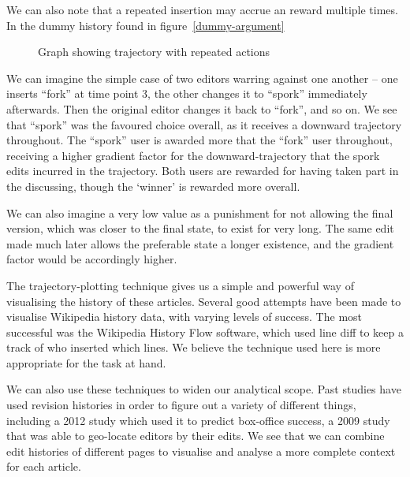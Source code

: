 We can also note that a repeated insertion may accrue an reward
multiple times. In the dummy history found in figure~\ref{dummy-argument}

\begin{wrapfigure}{i}{0.4\textwidth}
  \centering
  \pgfplotsset{width=0.4\textwidth}
  \caption{Graph showing trajectory with repeated actions}
  \label{fig:dummy-argument}
\end{wrapfigure}

We can imagine the simple case of two editors warring against one
another -- one inserts ``fork'' at time point 3, the other changes it
to ``spork'' immediately afterwards. Then the original editor changes
it back to ``fork'', and so on. We see that ``spork'' was the favoured
choice overall, as it receives a downward trajectory throughout. The
``spork'' user is awarded more that the ``fork'' user throughout,
receiving a higher gradient factor for the downward-trajectory that
the spork edits incurred in the trajectory. Both users are rewarded
for having taken part in the discussing, though the `winner' is
rewarded more overall.

We can also imagine a very low value as a punishment for not allowing
the final version, which was closer to the final state, to exist for
very long. The same edit made much later allows the preferable state a
longer existence, and the gradient factor would be accordingly higher. 

The trajectory-plotting technique gives us a simple and powerful way
of visualising the history of these articles. Several good attempts
have been made to visualise Wikipedia history data, with varying
levels of
success.\cite{Chi2008}\cite{Sabel2007}\cite{Suh2007}\cite{Wu2013}\cite{Viegas2004}
The most successful was the Wikipedia History Flow
software,\cite{iphylo-history}\cite{wiki-history-flow} which used line
diff to keep a track of who inserted which lines. We believe the
technique used here is more appropriate for the task at hand.

We can also use these techniques to widen our analytical scope. Past
studies have used revision histories in order to figure out a variety
of different things, including a 2012 study which used it to predict
box-office success,\cite{Mestyan2012} a 2009 study that was able to
geo-locate editors by their edits.\cite{Lieberman2009} We see that we
can combine edit histories of different pages to visualise and analyse
a more complete context for each article.

